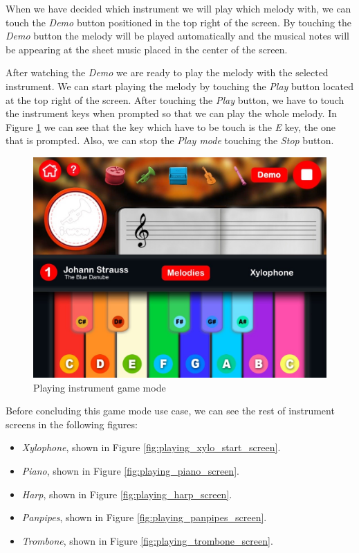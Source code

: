 \FloatBarrier

When we have decided which instrument we will play which melody with, we can touch the \textit{Demo} button positioned in the top right of the screen. By touching the \textit{Demo} button the melody will be played automatically and the musical notes will be appearing at the sheet music placed in the center of the screen.

After watching the \textit{Demo} we are ready to play the melody with the selected instrument. We can start playing the melody by touching the \textit{Play} button located at the top right of the screen. After touching the \textit{Play} button, we have to touch the instrument keys when prompted so that we can play the whole melody. In Figure \ref{fig:play_playing_screen} we can see that the key which have to be touch is the \textit{E} key, the one that is prompted. Also, we can stop the \textit{Play mode} touching the \textit{Stop} button.

\begin{figure}[ht!]
	\centering
	\includegraphics[width=400pt]{graphics/use-case/play_playing_screen.jpg}
	\caption{Playing instrument game mode}
	\label{fig:play_playing_screen}
\end{figure}

\FloatBarrier

Before concluding this game mode use case, we can see the rest of instrument screens in the following figures:
\begin{itemize}
\item \textit{Xylophone}, shown in Figure \ref{fig:playing_xylo_start_screen}.
\item \textit{Piano}, shown in Figure \ref{fig:playing_piano_screen}.
\item \textit{Harp}, shown in Figure \ref{fig:playing_harp_screen}.
\item \textit{Panpipes}, shown in Figure \ref{fig:playing_panpipes_screen}.
\item \textit{Trombone}, shown in Figure \ref{fig:playing_trombone_screen}.
\end{itemize}

